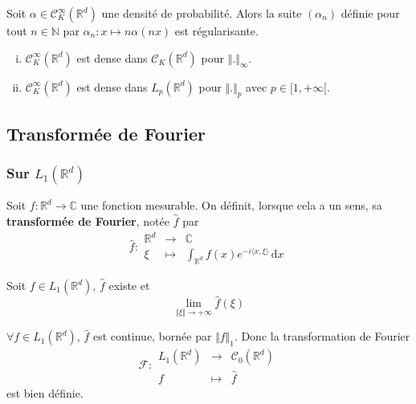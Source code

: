 
	\begin{example}
		Soit $\alpha \in \mathcal{C}^\infty_K(\mathbb{R}^d)$ une densité de probabilité. Alors la suite $(\alpha_n)$ définie pour tout $n \in \mathbb{N}$ par $\alpha_n : x \mapsto n \alpha(nx)$ est régularisante.
	\end{example}


	\begin{application}
		\begin{enumerate}[(i)]
			\item $\mathcal{C}^\infty_K(\mathbb{R}^d)$ est dense dans $\mathcal{C}_K(\mathbb{R}^d)$ pour $\Vert . \Vert_\infty$.
			\item $\mathcal{C}^\infty_K(\mathbb{R}^d)$ est dense dans $L_p(\mathbb{R}^d)$ pour $\Vert . \Vert_p$ avec $p \in [1, +\infty[$.
		\end{enumerate}
	\end{application}

	\subsection{Transformée de Fourier}

	\subsubsection{Sur \texorpdfstring{$L_1(\mathbb{R}^d)$}{Rᵈ}}


	\begin{definition}
		Soit $f : \mathbb{R}^d \rightarrow \mathbb{C}$ une fonction mesurable. On définit, lorsque cela a un sens, sa \textbf{transformée de Fourier}, notée $\widehat{f}$ par
		\[
		\widehat{f} :
		\begin{array}{ccc}
			\mathbb{R}^d &\rightarrow& \mathbb{C} \\
			\xi &\mapsto& \int_{\mathbb{R}^d} f(x) e^{-i\langle x, \xi \rangle} \, \mathrm{d}x
		\end{array}
		\]
	\end{definition}

	\begin{lemma}
		Soit $f \in L_1(\mathbb{R}^d)$, $\widehat{f}$ existe et
		\[ \lim_{\Vert \xi \Vert \rightarrow +\infty} \widehat{f}(\xi) \]
	\end{lemma}

	\begin{theorem}
		$\forall f \in L_1(\mathbb{R}^d)$, $\widehat{f}$ est continue, bornée par $\Vert f \Vert_1$. Donc la transformation de Fourier
		\[
		\mathcal{F} :
		\begin{array}{ccc}
			L_1(\mathbb{R}^d) &\rightarrow& \mathcal{C}_0(\mathbb{R}^d) \\
			f &\mapsto& \widehat{f}
		\end{array}
		\]
		est bien définie.
	\end{theorem}

